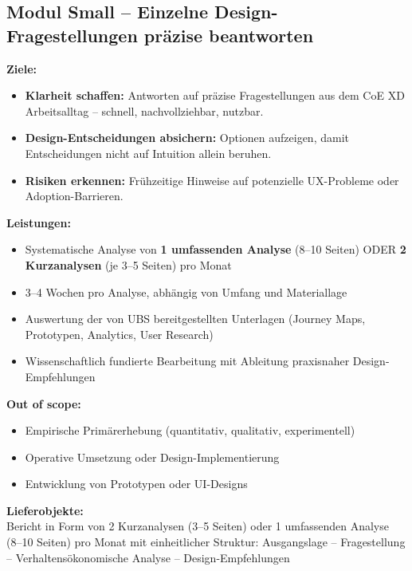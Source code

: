 \documentclass{fehradvice-report}
\begin{document}
\vspace{1cm}

\subsection{Modul Small -- Einzelne Design-Fragestellungen präzise beantworten}

\textbf{Ziele:}
\begin{itemize}
    \item[$\checkmark$] \textbf{Klarheit schaffen:} Antworten auf präzise Fragestellungen aus dem CoE XD Arbeitsalltag -- schnell, nachvollziehbar, nutzbar.
    \item[$\checkmark$] \textbf{Design-Entscheidungen absichern:} Optionen aufzeigen, damit Entscheidungen nicht auf Intuition allein beruhen.
    \item[$\checkmark$] \textbf{Risiken erkennen:} Frühzeitige Hinweise auf potenzielle UX-Probleme oder Adoption-Barrieren.
\end{itemize}

\textbf{Leistungen:}
\begin{itemize}
    \item Systematische Analyse von \textbf{1 umfassenden Analyse} (8--10 Seiten) ODER \textbf{2 Kurzanalysen} (je 3--5 Seiten) pro Monat
    \item 3--4 Wochen pro Analyse, abhängig von Umfang und Materiallage
    \item Auswertung der von UBS bereitgestellten Unterlagen (Journey Maps, Prototypen, Analytics, User Research)
    \item Wissenschaftlich fundierte Bearbeitung mit Ableitung praxisnaher Design-Empfehlungen
\end{itemize}

\textbf{Out of scope:}
\begin{itemize}
    \item[$\times$] Empirische Primärerhebung (quantitativ, qualitativ, experimentell)
    \item[$\times$] Operative Umsetzung oder Design-Implementierung
    \item[$\times$] Entwicklung von Prototypen oder UI-Designs
\end{itemize}

\textbf{Lieferobjekte:}\\
Bericht in Form von 2 Kurzanalysen (3--5 Seiten) oder 1 umfassenden Analyse (8--10 Seiten) pro Monat mit einheitlicher Struktur: Ausgangslage -- Fragestellung -- Verhaltensökonomische Analyse -- Design-Empfehlungen
\end{document}
